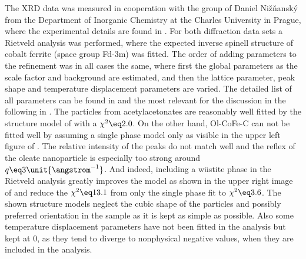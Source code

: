 \documentclass[\main/dresen_thesis.tex]{subfiles}
\begin{document}
    The XRD data was measured in cooperation with the group of Daniel Nižňanský from the Department of Inorganic Chemistry at the Charles University in Prague, where the experimental details are found in .
    For both diffraction data sets a Rietveld analysis was performed, where the expected inverse spinell structure of cobalt ferrite (space group Fd-3m) was fitted.
    The order of adding parameters to the refinement was in all cases the same, where first the global parameters as the scale factor and background are estimated, and then the lattice parameter, peak shape and temperature displacement parameters are varied.
    The detailed list of all parameters can be found in  and the most relevant for the discussion in the following in .
    The particles from acetylacetonates are reasonably well fitted by the structure model of  with a $\chi^2 \eq 2.0$.
    On the other hand, Ol-CoFe-C can not be fitted well by assuming a single phase model only as visible in the upper left figure of .
    The relative intensity of the peaks do not match well and the reflex of the oleate nanoparticle is especially too strong around $q \eq 3 \unit{\angstrom^{-1}}$.
    And indeed, including a w\"ustite phase in the Rietveld analysis greatly improves the model as shown in the upper right image of  and reduce the $\chi^2 \eq 13.1$ from only the single phase fit to $\chi^2 \eq 3.6$.
    The shown structure models neglect the cubic shape of the particles and possibly preferred orientation in the sample as it is kept as simple as possible.
    Also some temperature displacement parameters have not been fitted in the analysis but kept at $0$, as they tend to diverge to nonphysical negative values, when they are included in the analysis.
\end{document}
